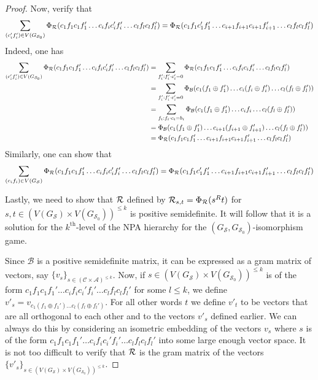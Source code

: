 \documentclass[11pt,a4paper]{article}
\theoremstyle{plain}
\theoremstyle{remark}
\theoremstyle{definition}
\def\calA{{\mathcal A}} \def\calB{{\mathcal B}} \def\calC{{\mathcal C}}
\def\calS{{\mathcal S}} \def\calT{{\mathcal T}} \def\calU{{\mathcal U}}
\begin{document}
\begin{proof}
    Now, verify that 
    $$\sum_{(c_i'f_i') \in V(G_{\calS_0})}\Phi_{\calR}(c_1f_1c_1f_1'\dots c_if_ic_i'f_i' \dots c_lf_lc_lf_l') = \Phi_{\calR}(c_1f_1c_1'f_1'\dots c_{i+1}f_{i+1}c_{i+1}f_{i+1}' \dots c_lf_lc_lf_l') $$
    Indeed, one has 
    \begin{align*}
        \sum_{(c_i'f_i') \in V(G_{\calS_0})} \Phi_{\calR}(c_1f_1c_1f_1'\dots c_if_ic_i'f_i' \dots c_lf_lc_lf_l') & = \sum_{f_i' : f_i'\cdot c_i' = 0}\Phi_{\calR}(c_1f_1c_1f_1'\dots c_if_ic_if_i' \dots c_lf_lc_lf_l') \\
        & = \sum_{f_i' : f_i'\cdot c_i' = 0}\Phi_{\calB}(c_1(f_1 \oplus f_1')\dots c_i(f_i \oplus f_i')\dots c_l(f_l \oplus f_l')) \\
        & = \sum_{f_i : f_i\cdot c_i = b_i}\Phi_{\calB}(c_1(f_1 \oplus f_1')\dots c_if_i\dots c_l(f_l \oplus f_l')) \\
        & = \Phi_{\calB}(c_1(f_1 \oplus f_1')\dots c_{i+1}(f_{i+1}\oplus f_{i+1}')\dots c_l(f_l \oplus f_l')) \\
        & = \Phi_{\calR}(c_1f_1c_1f_1'\dots c_{i+1}f_{i+1}c_{i+1}f_{i+1}' \dots c_lf_lc_lf_l')
    \end{align*}
    Similarly, one can show that 
    $$\sum_{(c_if_i) \in V(G_{\calS})}\Phi_{\calR}(c_1f_1c_1f_1'\dots c_if_ic_i'f_i' \dots c_lf_lc_lf_l') = \Phi_{\calR}(c_1f_1c_1'f_1'\dots c_{i+1}f_{i+1}c_{i+1}f_{i+1}' \dots c_lf_lc_lf_l') $$

    Lastly, we need to show that ${\mathcal R}$ defined by ${\mathcal R}_{s,t} = \Phi_{{\mathcal R}}(s^Rt)$ for $s,t \in (V(G_{\calS}) \times V(G_{\calS_0}))^{\leq k}$ is positive semidefinite. It will follow that it is a solution for the $k^{\text{th}}$-level of the NPA hierarchy for the $(G_{\calS}, G_{\calS_0})$-isomorphism game. 

    Since $\calB$ is a positive semidefinite matrix, it can be expressed as a gram matrix of vectors, say $\{v_s\}_{s \in (\calC \times \calA)^{\leq k}}$. Now, if $s \in (V(G_\calS) \times V(G_{\calS_0}))^{\leq k}$ is of the form $c_1f_1c_1f_1'\dots c_if_ic_i'f_i' \dots c_lf_lc_lf_l'$ for some $l \leq k$, we define $v'_s = v_{c_1(f_1 \oplus f_1') \dots c_l(f_l \oplus f_l')}$. For all other words $t$ we define $v'_t$ to be vectors that are all orthogonal to each other and to the vectors $v'_s$ defined earlier. We can always do this by considering an isometric embedding of the vectors $v_s$ where $s$ is of the form $c_1f_1c_1f_1'\dots c_if_ic_i'f_i' \dots c_lf_lc_lf_l'$ into some large enough vector space. It is not too difficult to verify that ${\mathcal R}$ is the gram matrix of the vectors $\{v'_s\}_{s \in (V(G_\calS) \times V(G_{\calS_0}))^{\leq k}}$. 


\end{proof}
\end{document}
